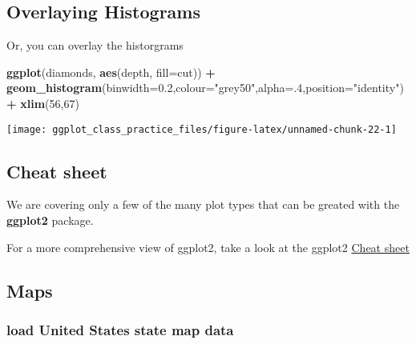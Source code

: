 \documentclass[
]{article}
\newenvironment{Shaded}{\begin{snugshade}}{\end{snugshade}}
\newcommand{\AttributeTok}[1]{\textcolor[rgb]{0.13,0.29,0.53}{#1}}
\newcommand{\DecValTok}[1]{\textcolor[rgb]{0.00,0.00,0.81}{#1}}
\newcommand{\FloatTok}[1]{\textcolor[rgb]{0.00,0.00,0.81}{#1}}
\newcommand{\FunctionTok}[1]{\textcolor[rgb]{0.13,0.29,0.53}{\textbf{#1}}}
\newcommand{\NormalTok}[1]{#1}
\newcommand{\SpecialCharTok}[1]{\textcolor[rgb]{0.81,0.36,0.00}{\textbf{#1}}}
\newcommand{\StringTok}[1]{\textcolor[rgb]{0.31,0.60,0.02}{#1}}
\begin{document}
\hypertarget{overlaying-histograms}{%
\subsection{Overlaying Histograms}\label{overlaying-histograms}}

Or, you can overlay the historgrams

\begin{Shaded}
\begin{Highlighting}[]
\FunctionTok{ggplot}\NormalTok{(diamonds, }\FunctionTok{aes}\NormalTok{(depth, }\AttributeTok{fill=}\NormalTok{cut)) }\SpecialCharTok{+} 
    \FunctionTok{geom\_histogram}\NormalTok{(}\AttributeTok{binwidth=}\FloatTok{0.2}\NormalTok{,}\AttributeTok{colour=}\StringTok{"grey50"}\NormalTok{,}\AttributeTok{alpha=}\NormalTok{.}\DecValTok{4}\NormalTok{,}\AttributeTok{position=}\StringTok{"identity"}\NormalTok{) }\SpecialCharTok{+} \FunctionTok{xlim}\NormalTok{(}\DecValTok{56}\NormalTok{,}\DecValTok{67}\NormalTok{)}
\end{Highlighting}
\end{Shaded}

\begin{center}\texttt{[image: ggplot\_class\_practice\_files/figure-latex/unnamed-chunk-22-1]} \end{center}

\hypertarget{cheat-sheet}{%
\subsection{Cheat sheet}\label{cheat-sheet}}

We are covering only a few of the many plot types that can be greated
with the \textbf{ggplot2} package.

For a more comprehensive view of ggplot2, take a look at the ggplot2
\href{https://r4ds.had.co.nz/data-visualisation.html}{Cheat sheet}

\hypertarget{maps}{%
\subsection{Maps}\label{maps}}

\hypertarget{load-united-states-state-map-data}{%
\subsubsection{load United States state map
data}\label{load-united-states-state-map-data}}
\end{document}

